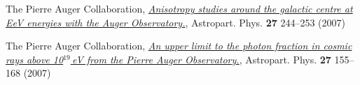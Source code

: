 \begin{etaremune}
\item {}The Pierre Auger Collaboration,
\href{http://dx.doi.org/10.1016/j.astropartphys.2006.11.002}{\emph{Anisotropy
studies around the galactic centre at EeV energies with the Auger
Observatory.}},  Astropart. Phys. {\bf 27} 244--253 (2007)

\item {}The Pierre Auger Collaboration,
\href{http://dx.doi.org/10.1016/j.astropartphys.2006.10.004}{\emph{An upper
limit to the photon fraction in cosmic rays above 10$^{19}$\,eV from the Pierre
Auger Observatory.}}, Astropart. Phys. {\bf 27} 155--168 (2007)
\end{etaremune}
